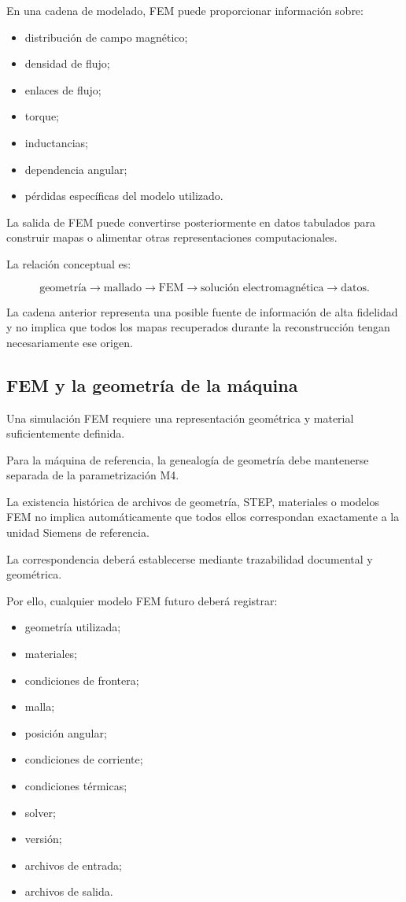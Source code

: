 En una cadena de modelado, FEM puede proporcionar información sobre:

\begin{itemize}
\item distribución de campo magnético;
\item densidad de flujo;
\item enlaces de flujo;
\item torque;
\item inductancias;
\item dependencia angular;
\item pérdidas específicas del modelo utilizado.
\end{itemize}

La salida de FEM puede convertirse posteriormente en datos tabulados para construir mapas o alimentar otras representaciones computacionales.

La relación conceptual es:

\begin{equation}
\text{geometría}
\rightarrow
\text{mallado}
\rightarrow
\mathrm{FEM}
\rightarrow
\text{solución electromagnética}
\rightarrow
\text{datos}.
\end{equation}

La cadena anterior representa una posible fuente de información de alta fidelidad y no implica que todos los mapas recuperados durante la reconstrucción tengan necesariamente ese origen.

\subsection{FEM y la geometría de la máquina}

Una simulación FEM requiere una representación geométrica y material suficientemente definida.

Para la máquina de referencia, la genealogía de geometría debe mantenerse separada de la parametrización M4.

La existencia histórica de archivos de geometría, STEP, materiales o modelos FEM no implica automáticamente que todos ellos correspondan exactamente a la unidad Siemens de referencia.

La correspondencia deberá establecerse mediante trazabilidad documental y geométrica.

Por ello, cualquier modelo FEM futuro deberá registrar:

\begin{itemize}
\item geometría utilizada;
\item materiales;
\item condiciones de frontera;
\item malla;
\item posición angular;
\item condiciones de corriente;
\item condiciones térmicas;
\item solver;
\item versión;
\item archivos de entrada;
\item archivos de salida.
\end{itemize}

